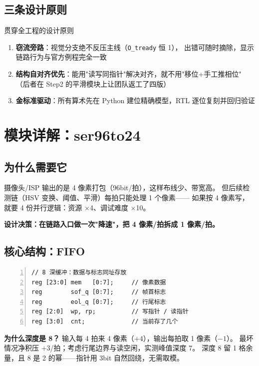 \subsection{三条设计原则}

\begin{okbox}{贯穿全工程的设计原则}
\begin{enumerate}
  \item \textbf{窃流旁路}：视觉分支绝不反压主线（\texttt{O\_tready} 恒 1），
        出错可随时摘除，显示链路行为与官方例程完全一致
  \item \textbf{结构自对齐优先}：能用"读写同指针"解决对齐，就不用"移位+手工推相位"
        （后者在 Step2 的平滑模块上让团队返工了四版）
  \item \textbf{金标准驱动}：所有算术先在 Python 建位精确模型，RTL 逐位复刻并回归验证
\end{enumerate}
\end{okbox}

\section{模块详解：ser96to24}

\subsection{为什么需要它}

摄像头/ISP 输出的是 4 像素打包（96bit/拍），这样布线少、带宽高。
但后续检测链（HSV 变换、阈值、平滑）每拍只能处理 1 个像素——
如果按 4 像素写，就要 4 份并行逻辑：资源 $\times$4、调试难度 $\times$10。

\textbf{设计决策：在链路入口做一次"降速"，把 4 像素/拍拆成 1 像素/拍。}

\subsection{核心结构：FIFO}

\begin{Verbatim}[frame=single,fontsize=\small,numbers=left]
// 8 深缓冲：数据与标志同址存放
reg [23:0] mem   [0:7];     // 像素数据
reg        sof_q [0:7];     // 帧首标志
reg        eol_q [0:7];     // 行尾标志
reg [2:0]  wp, rp;          // 写指针 / 读指针
reg [3:0]  cnt;             // 当前存了几个
\end{Verbatim}

\textbf{为什么深度是 8？}\quad
输入每 4 拍来 4 像素（$+4$），输出每拍取 1 像素（$-1$）。
最坏情况净积压 $+3$/拍；考虑行尾边界与读空闲，实测峰值深度 7。
深度 8 留 1 格余量，且 8 是 2 的幂——指针用 3bit 自然回绕，无需取模。

